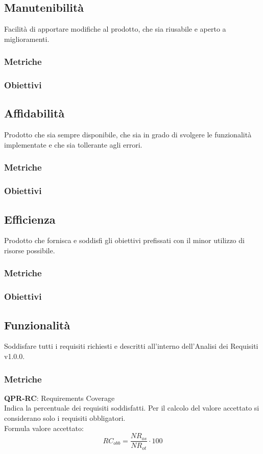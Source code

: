 \subsection{Manutenibilità}
Facilità di apportare modifiche al prodotto, che sia riusabile e aperto a miglioramenti.
\subsubsection{Metriche}
\subsubsection{Obiettivi}

\subsection{Affidabilità}
Prodotto che sia sempre disponibile, che sia in grado di svolgere le funzionalità implementate e che sia tollerante agli errori.
\subsubsection{Metriche}
\subsubsection{Obiettivi}

\subsection{Efficienza}
Prodotto che fornisca e soddisfi gli obiettivi prefissati con il minor utilizzo di risorse possibile.
\subsubsection{Metriche}
\subsubsection{Obiettivi}

\subsection{Funzionalità}
Soddisfare tutti i requisiti richiesti e descritti all'interno dell'Analisi dei Requisiti v1.0.0.
\subsubsection{Metriche}
\textbf{QPR-RC}: Requirements Coverage \\
Indica la percentuale dei requisiti soddisfatti. Per il calcolo del valore accettato si considerano solo i requisiti obbligatori.\\
Formula valore accettato:
$$RC_{obb} = \frac{NR_{os}}{NR_{ot}} \cdot 100$$

